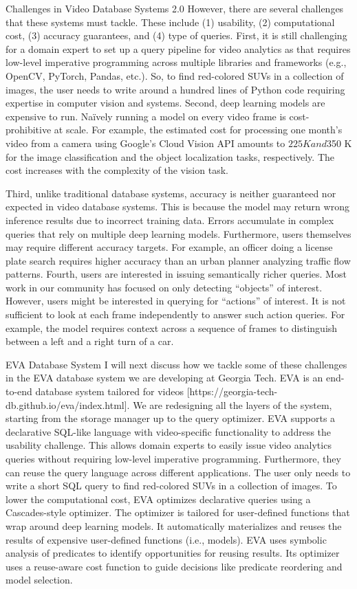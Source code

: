 \documentclass[11pt]{article}
\begin{document}
Challenges in Video Database Systems 2.0
However, there are several challenges that these systems must tackle. These include (1) usability, (2) computational cost, (3) accuracy guarantees, and (4) type of queries. First, it is still challenging for a domain expert to set up a query pipeline for video analytics as that requires low-level imperative programming across multiple libraries and frameworks (e.g., OpenCV, PyTorch, Pandas, etc.). So, to find red-colored SUVs in a collection of images, the user needs to write around a hundred lines of Python code requiring expertise in computer vision and systems. Second, deep learning models are expensive to run. Naïvely running a model on every video frame is cost-prohibitive at scale. For example, the estimated cost for processing one month’s video from a camera using Google’s Cloud Vision API amounts to $225 K and $350 K for the image classification and the object localization tasks, respectively. The cost increases with the complexity of the vision task. 

Third, unlike traditional database systems, accuracy is neither guaranteed nor expected in video database systems. This is because the model may return wrong inference results due to incorrect training data. Errors accumulate in complex queries that rely on multiple deep learning models. Furthermore, users themselves may require different accuracy targets. For example, an officer doing a license plate search requires higher accuracy than an urban planner analyzing traffic flow patterns. Fourth, users are interested in issuing semantically richer queries. Most work in our community has focused on only detecting “objects” of interest. However, users might be interested in querying for “actions” of interest. It is not sufficient to look at each frame independently to answer such action queries. For example, the model requires context across a sequence of frames to distinguish between a left and a right turn of a car. 

EVA Database System
I will next discuss how we tackle some of these challenges in the EVA database system we are developing at Georgia Tech. EVA is an end-to-end database system tailored for videos [https://georgia-tech-db.github.io/eva/index.html]. We are redesigning all the layers of the system, starting from the storage manager up to the query optimizer. EVA supports a declarative SQL-like language with video-specific functionality to address the usability challenge. This allows domain experts to easily issue video analytics queries without requiring low-level imperative programming. Furthermore, they can reuse the query language across different applications. The user only needs to write a short SQL query to find red-colored SUVs in a collection of images. To lower the computational cost, EVA optimizes declarative queries using a Cascades-style optimizer. The optimizer is tailored for user-defined functions that wrap around deep learning models. It automatically materializes and reuses the results of expensive user-defined functions (i.e., models). EVA uses symbolic analysis of predicates to identify opportunities for reusing results. Its optimizer uses a reuse-aware cost function to guide decisions like predicate reordering and model selection. 
\end{document}
